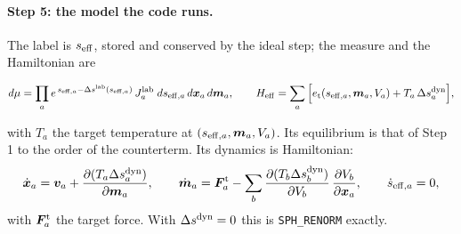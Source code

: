 \documentclass[11pt,aps,preprint,nofootinbib,superscriptaddress,tightenlines]{revtex4-2}
\def\st{\begin{equation}}
\def\stp{\end{equation}}
\let\oldparagraph\paragraph
\renewcommand{\paragraph}{\par\bigskip\oldparagraph}
\begin{document}
\paragraph{Step 5: the model the code runs.}  The label is $s_{\rm eff}$, stored and conserved by the ideal step; the measure and the Hamiltonian are
\begin{keyeq}
\st
d\mu=\prod_a e^{\,s_{{\rm eff},a}-\Delta s^{\rm lab}(s_{{\rm eff},a})}\,J^{\rm lab}_a\;ds_{{\rm eff},a}\,d\bm x_a\,d\bm m_a,\qquad
H_{\rm eff}=\sum_a\Big[e_{\rm t}(s_{{\rm eff},a},\bm m_a,V_a)+T_a\,\Delta s^{\rm dyn}_a\Big] ,
\label{seffmodel}
\stp
\end{keyeq}
with $T_a$ the target temperature at $(s_{{\rm eff},a},\bm m_a,V_a)$.  Its equilibrium is that of Step 1 to the order of the counterterm.  Its dynamics is Hamiltonian:
\st
\dot{\bm x}_a=\bm v_a+\frac{\partial(T_a\Delta s^{\rm dyn}_a)}{\partial\bm m_a},\qquad
\dot{\bm m}_a=\bm F^{\rm t}_a-\sum_b\frac{\partial(T_b\Delta s^{\rm dyn}_b)}{\partial V_b}\,\frac{\partial V_b}{\partial\bm x_a},\qquad \dot s_{{\rm eff},a}=0 ,
\stp
with $\bm F^{\rm t}_a$ the target force.  With $\Delta s^{\rm dyn}=0$ this is \texttt{SPH\_RENORM} exactly.
\end{document}
